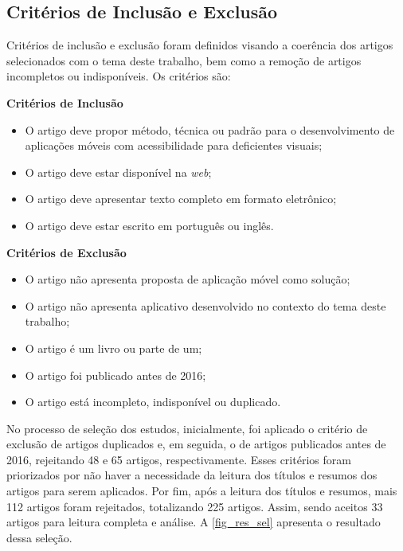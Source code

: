 \subsection{Critérios de Inclusão e Exclusão}

Critérios de inclusão e exclusão foram definidos visando a coerência dos artigos selecionados com o tema deste trabalho, bem como a remoção de artigos incompletos ou indisponíveis.
Os critérios são:

\textbf{Critérios de Inclusão}
\begin{itemize}
  \item O artigo deve propor método, técnica ou padrão para o desenvolvimento de aplicações móveis com acessibilidade para deficientes visuais;
  \item O artigo deve estar disponível na \emph{web};
  \item O artigo deve apresentar texto completo em formato eletrônico;
  \item O artigo deve estar escrito em português ou inglês.
\end{itemize}

\textbf{Critérios de Exclusão}
\begin{itemize}
  \item O artigo não apresenta proposta de aplicação móvel como solução;
  \item O artigo não apresenta aplicativo desenvolvido no contexto do tema deste trabalho;
  \item O artigo é um livro ou parte de um;
  \item O artigo foi publicado antes de 2016;
  \item O artigo está incompleto, indisponível ou duplicado.
\end{itemize}

No processo de seleção dos estudos, inicialmente, foi aplicado o critério de exclusão de artigos duplicados e, em seguida, o de artigos publicados antes de 2016, rejeitando 48 e 65 artigos, respectivamente.
Esses critérios foram priorizados por não haver a necessidade da leitura dos títulos e resumos dos artigos para serem aplicados.
Por fim, após a leitura dos títulos e resumos, mais 112 artigos foram rejeitados, totalizando 225 artigos.
Assim, sendo aceitos 33 artigos para leitura completa e análise.
A \autoref{fig_res_sel} apresenta o resultado dessa seleção.

